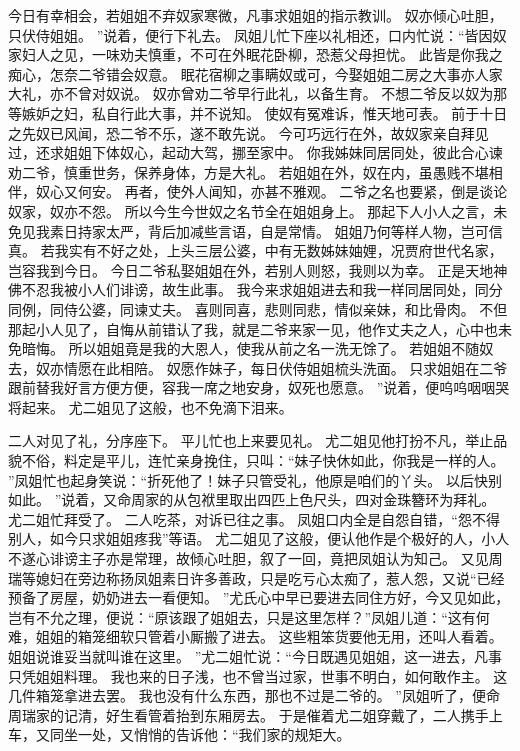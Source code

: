今日有幸相会，若姐姐不弃奴家寒微，凡事求姐姐的指示教训。
奴亦倾心吐胆，只伏侍姐姐。
”说着，便行下礼去。
凤姐儿忙下座以礼相还，口内忙说：“皆因奴家妇人之见，一味劝夫慎重，不可在外眠花卧柳，恐惹父母担忧。
此皆是你我之痴心，怎奈二爷错会奴意。
眠花宿柳之事瞒奴或可，今娶姐姐二房之大事亦人家大礼，亦不曾对奴说。
奴亦曾劝二爷早行此礼，以备生育。
不想二爷反以奴为那等嫉妒之妇，私自行此大事，并不说知。
使奴有冤难诉，惟天地可表。
前于十日之先奴已风闻，恐二爷不乐，遂不敢先说。
今可巧远行在外，故奴家亲自拜见过，还求姐姐下体奴心，起动大驾，挪至家中。
你我姊妹同居同处，彼此合心谏劝二爷，慎重世务，保养身体，方是大礼。
若姐姐在外，奴在内，虽愚贱不堪相伴，奴心又何安。
再者，使外人闻知，亦甚不雅观。
二爷之名也要紧，倒是谈论奴家，奴亦不怨。
所以今生今世奴之名节全在姐姐身上。
那起下人小人之言，未免见我素日持家太严，背后加减些言语，自是常情。
姐姐乃何等样人物，岂可信真。
若我实有不好之处，上头三层公婆，中有无数姊妹妯娌，况贾府世代名家，岂容我到今日。
今日二爷私娶姐姐在外，若别人则怒，我则以为幸。
正是天地神佛不忍我被小人们诽谤，故生此事。
我今来求姐姐进去和我一样同居同处，同分同例，同侍公婆，同谏丈夫。
喜则同喜，悲则同悲，情似亲妹，和比骨肉。
不但那起小人见了，自悔从前错认了我，就是二爷来家一见，他作丈夫之人，心中也未免暗悔。
所以姐姐竟是我的大恩人，使我从前之名一洗无馀了。
若姐姐不随奴去，奴亦情愿在此相陪。
奴愿作妹子，每日伏侍姐姐梳头洗面。
只求姐姐在二爷跟前替我好言方便方便，容我一席之地安身，奴死也愿意。
”说着，便呜呜咽咽哭将起来。
尤二姐见了这般，也不免滴下泪来。
\par
二人对见了礼，分序座下。
平儿忙也上来要见礼。
尤二姐见他打扮不凡，举止品貌不俗，料定是平儿，连忙亲身挽住，只叫：“妹子快休如此，你我是一样的人。
”凤姐忙也起身笑说：“折死他了！妹子只管受礼，他原是咱们的丫头。
以后快别如此。
”说着，又命周家的从包袱里取出四匹上色尺头，四对金珠簪环为拜礼。
尤二姐忙拜受了。
二人吃茶，对诉已往之事。
凤姐口内全是自怨自错，“怨不得别人，如今只求姐姐疼我”等语。
尤二姐见了这般，便认他作是个极好的人，小人不遂心诽谤主子亦是常理，故倾心吐胆，叙了一回，竟把凤姐认为知己。
又见周瑞等媳妇在旁边称扬凤姐素日许多善政，只是吃亏心太痴了，惹人怨，又说“已经预备了房屋，奶奶进去一看便知。
”尤氏心中早已要进去同住方好，今又见如此，岂有不允之理，便说：“原该跟了姐姐去，只是这里怎样？”凤姐儿道：“这有何难，姐姐的箱笼细软只管着小厮搬了进去。
这些粗笨货要他无用，还叫人看着。
姐姐说谁妥当就叫谁在这里。
”尤二姐忙说：“今日既遇见姐姐，这一进去，凡事只凭姐姐料理。
我也来的日子浅，也不曾当过家，世事不明白，如何敢作主。
这几件箱笼拿进去罢。
我也没有什么东西，那也不过是二爷的。
”凤姐听了，便命周瑞家的记清，好生看管着抬到东厢房去。
于是催着尤二姐穿戴了，二人携手上车，又同坐一处，又悄悄的告诉他：“我们家的规矩大。
